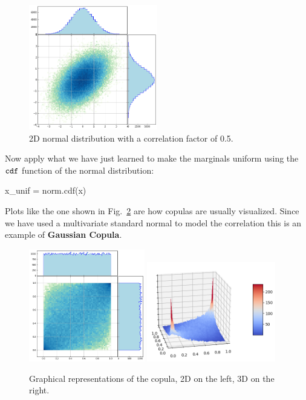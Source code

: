 \begin{figure}[htbp]
  \centering
  \includegraphics[width=0.5\textwidth]{figures/2d_gaussian}
  \caption{2D normal distribution with a correlation factor of 0.5.}
  \label{fig:multivariate_with_correlation}
\end{figure}
    
Now apply what we have just learned to make the marginals uniform using the \(\tt{cdf}\) function of the normal distribution:

\begin{ipython}
x_unif = norm.cdf(x)
\end{ipython}

Plots like the one shown in Fig.~\ref{fig:copula} are how copulas are usually visualized. Since we have used a multivariate standard normal to model the correlation this is an example of \textbf{Gaussian Copula}.

\begin{figure}[htbp]
\centering
\includegraphics[width=0.45\textwidth]{figures/copula_2d}
\quad
\includegraphics[width=0.5\textwidth]{figures/copula_3d}
\caption{Graphical representations of the copula, 2D on the left, 3D on the right.}
\label{fig:copula}
\end{figure}

